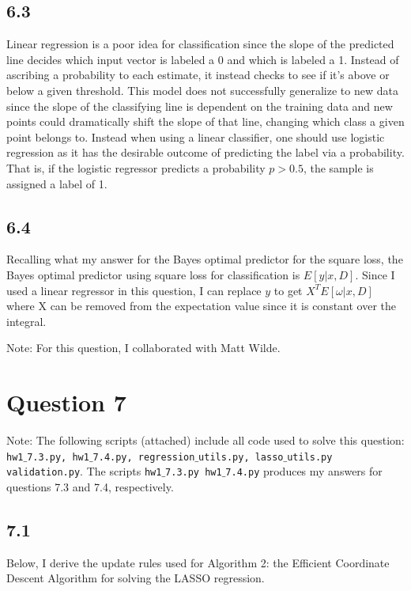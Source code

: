 \documentclass[12pt]{amsart}
\begin{document}
\subsection*{6.3}
Linear regression is a poor idea for classification since the slope of the predicted line decides which input vector is labeled a 0 and which is labeled a 1.  Instead of ascribing a probability to each estimate, it instead checks to see if it's above or below a given threshold.  This model does not successfully generalize to new data since the slope of the classifying line is dependent on the training data and new points could dramatically shift the slope of that line, changing which class a given point belongs to.  Instead when using a linear classifier, one should use logistic regression as it has the desirable outcome of predicting the label via a probability.  That is, if the logistic regressor predicts a probability $p > 0.5$, the sample is assigned a label of 1.

\subsection*{6.4}

Recalling what my answer for the Bayes optimal predictor for the square loss, the Bayes optimal predictor using square loss for classification is $E[y|x,D]$.  Since I used a linear regressor in this question, I can replace $y$ to get $X^TE[\omega|x,D]$ where X can be removed from the expectation value since it is constant over the integral.

Note: For this question, I collaborated with Matt Wilde.


\section*{Question 7}

Note: The following scripts (attached) include all code used to solve this question: {\tt hw1$\_$7.3.py, hw1$\_$7.4.py, regression$\_$utils.py, lasso$\_$utils.py  validation.py}.  The scripts {\tt hw1$\_$7.3.py  hw1$\_$7.4.py} produces my answers for questions 7.3 and 7.4, respectively.  

\subsection*{7.1}

Below, I derive the update rules used for Algorithm 2: the Efficient Coordinate Descent Algorithm for solving the LASSO regression.
\end{document}
